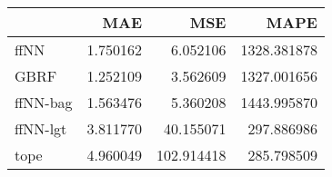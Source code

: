 \begin{tabular}{lrrr}
\toprule
{} &       MAE &         MSE &         MAPE \\
\midrule
ffNN     &  1.750162 &    6.052106 &  1328.381878 \\
GBRF     &  1.252109 &    3.562609 &  1327.001656 \\
ffNN-bag &  1.563476 &    5.360208 &  1443.995870 \\
ffNN-lgt &  3.811770 &   40.155071 &   297.886986 \\
tope     &  4.960049 &  102.914418 &   285.798509 \\
\bottomrule
\end{tabular}
